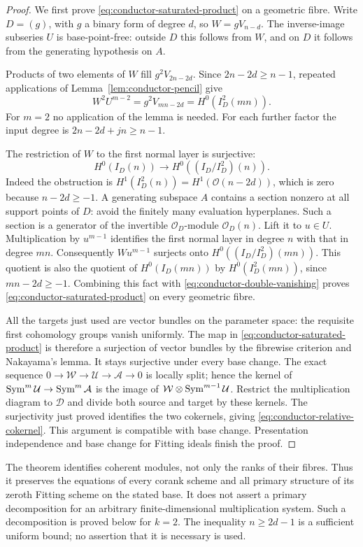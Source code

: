 \begin{proof}
We first prove \eqref{eq:conductor-saturated-product} on a geometric
fibre. Write $D=(g)$, with $g$ a binary form of degree $d$, so
$W=gV_{n-d}$. The inverse-image subseries $U$ is base-point-free:
outside $D$ this follows from $W$, and on $D$ it follows from the
generating hypothesis on $A$.

Products of two elements of $W$ fill
$g^2V_{2n-2d}$. Since $2n-2d\ge n-1$, repeated applications of
Lemma~\ref{lem:conductor-pencil} give
\begin{equation}\label{eq:conductor-double-vanishing}
 W^2U^{m-2}=g^2V_{mn-2d}=H^0(I_D^2(mn)).
\end{equation}
For $m=2$ no application of the lemma is needed. For each further
factor the input degree is $2n-2d+jn\ge n-1$.

The restriction of $W$ to the first normal layer is surjective:
\[
 H^0(I_D(n))\longrightarrow H^0((I_D/I_D^2)(n)).
\]
Indeed the obstruction is $H^1(I_D^2(n))=H^1(\mathcal O(n-2d))$,
which is zero because $n-2d\ge-1$. A generating subspace $A$
contains a section nonzero at all support points of $D$: avoid the
finitely many evaluation hyperplanes. Such a section is a generator
of the invertible $\mathcal O_D$-module $\mathcal O_D(n)$. Lift it
to $u\in U$. Multiplication by $u^{m-1}$ identifies the first
normal layer in degree $n$ with that in degree $mn$. Consequently
$Wu^{m-1}$ surjects onto $H^0((I_D/I_D^2)(mn))$. This quotient
is also the quotient of $H^0(I_D(mn))$ by
$H^0(I_D^2(mn))$, since $mn-2d\ge-1$. Combining this fact with
\eqref{eq:conductor-double-vanishing} proves
\eqref{eq:conductor-saturated-product} on every geometric fibre.

All the targets just used are vector bundles on the parameter space:
the requisite first cohomology groups vanish uniformly. The map in
\eqref{eq:conductor-saturated-product} is therefore a surjection
of vector bundles by the fibrewise criterion and Nakayama's lemma.
It stays surjective under every base change. The exact sequence
$0\to\mathcal W\to\mathcal U\to\mathcal A\to0$ is locally split;
hence the kernel of $\operatorname{Sym}^m\mathcal U\to\operatorname{Sym}^m\mathcal A$ is
the image of $\mathcal W\otimes\operatorname{Sym}^{m-1}\mathcal U$. Restrict
the multiplication diagram to $\mathcal D$ and divide both source
and target by these kernels. The surjectivity just proved identifies
the two cokernels, giving \eqref{eq:conductor-relative-cokernel}.
This argument is compatible with base change. Presentation
independence and base change for Fitting ideals
\cite[Lemma 15.8.4, Tag 07ZA]{StacksFitting} finish the proof.
\end{proof}

\begin{remark}\label{rem:conductor-scope}
The theorem identifies coherent modules, not only the ranks of their
fibres. Thus it preserves the equations of every corank scheme and
all primary structure of its zeroth Fitting scheme on the stated
base. It does not assert a primary decomposition for an arbitrary
finite-dimensional multiplication system. Such a decomposition is
proved below for $k=2$. The inequality $n\ge2d-1$ is a sufficient
uniform bound; no assertion that it is necessary is used.
\end{remark}
